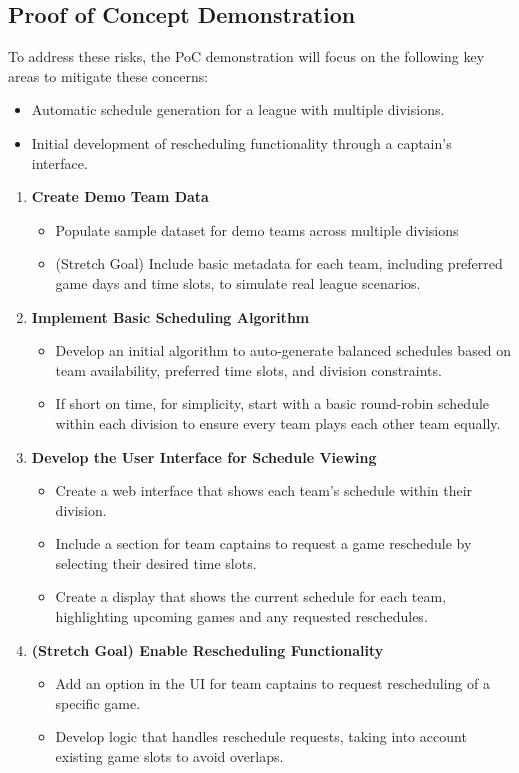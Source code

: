\documentclass{article}
\begin{document}
\subsection{Proof of Concept Demonstration}
To address these risks, the PoC demonstration will focus on the following key areas to mitigate these concerns:

\begin{itemize}
    \item Automatic schedule generation for a league with multiple divisions.
    \item Initial development of rescheduling functionality through a captain’s interface.
\end{itemize}
\begin{enumerate}
    \item \textbf{Create Demo Team Data}
    \begin{itemize}
        \item Populate sample dataset for demo teams across multiple divisions
        \item (Stretch Goal) Include basic metadata for each team, including preferred game days and time slots, to simulate real league scenarios.
    \end{itemize}

    \item \textbf{Implement Basic Scheduling Algorithm}
    \begin{itemize}
        \item Develop an initial algorithm to auto-generate balanced schedules based on team availability, preferred time slots, and division constraints.
        \item If short on time, for simplicity, start with a basic round-robin schedule within each division to ensure every team plays each other team equally.
    \end{itemize}

    \item \textbf{Develop the User Interface for Schedule Viewing}
    \begin{itemize}
        \item Create a web interface that shows each team’s schedule within their division.
        \item Include a section for team captains to request a game reschedule by selecting their desired time slots.
        \item Create a display that shows the current schedule for each team, highlighting upcoming games and any requested reschedules.
    \end{itemize}
    
    \item \textbf{(Stretch Goal) Enable Rescheduling Functionality}
    \begin{itemize}
        \item Add an option in the UI for team captains to request rescheduling of a specific game.
        \item Develop logic that handles reschedule requests, taking into account existing game slots to avoid overlaps.
    \end{itemize}

\end{enumerate}
\end{document}
